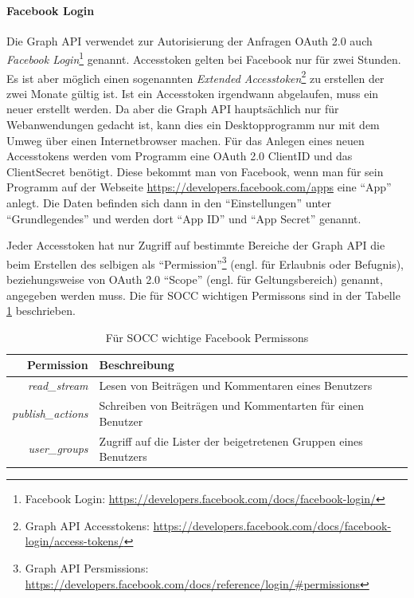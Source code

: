 
\paragraph{Facebook Login} %
\label{par:facebook_login}

Die Graph API verwendet zur Autorisierung der Anfragen OAuth 2.0 auch \emph{Facebook Login}\footnote{Facebook Login: \url{https://developers.facebook.com/docs/facebook-login/}} genannt. Accesstoken gelten bei Facebook nur für zwei Stunden. Es ist aber möglich einen sogenannten \emph{Extended Accesstoken}\footnote{Graph API Accesstokens: \url{https://developers.facebook.com/docs/facebook-login/access-tokens/}} zu erstellen der zwei Monate gültig ist. Ist ein Accesstoken irgendwann abgelaufen, muss ein neuer erstellt werden. Da aber die Graph API hauptsächlich nur für Webanwendungen gedacht ist, kann dies ein Desktopprogramm nur mit dem Umweg über einen Internetbrowser machen. Für das Anlegen eines neuen Accesstokens werden vom Programm eine OAuth 2.0 ClientID und das ClientSecret benötigt. Diese bekommt man von Facebook, wenn man für sein Programm auf der Webseite \url{https://developers.facebook.com/apps} eine \enquote{App} anlegt. Die Daten befinden sich dann in den \enquote{Einstellungen} unter \enquote{Grundlegendes} und werden dort \enquote{App ID} und \enquote{App Secret} genannt.

Jeder Accesstoken hat nur Zugriff auf bestimmte Bereiche der Graph API die beim Erstellen des selbigen als \enquote{Permission}\footnote{Graph API Persmissions: \url{https://developers.facebook.com/docs/reference/login/\#permissions}} (engl. für Erlaubnis oder Befugnis), beziehungsweise von OAuth 2.0 \enquote{Scope} (engl. für Geltungsbereich) genannt, angegeben werden muss. Die für SOCC wichtigen Permissons sind in der Tabelle \ref{tbl:socc_facebook_persmissons} beschrieben.

\begin{table}[ht]
    \centering
    \caption{Für SOCC wichtige Facebook Permissons}
    \begin{tabular}{r|p{10cm}}
        \textbf{Permission} & 
        \textbf{Beschreibung} \\ 
        \hline
        \textit{read\_stream} & 
        Lesen von Beiträgen und Kommentaren eines Benutzers \\
        \textit{publish\_actions} & 
        Schreiben von Beiträgen und Kommentarten für einen Benutzer \\
        \textit{user\_groups} & 
        Zugriff auf die Lister der beigetretenen Gruppen eines Benutzers
    \end{tabular}
    \label{tbl:socc_facebook_persmissons}
\end{table}

